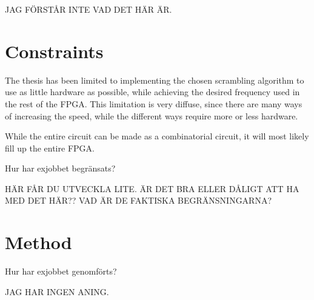 JAG FÖRSTÅR INTE VAD DET HÄR ÄR.

\section{Constraints}
The thesis has been limited to implementing the chosen scrambling 
algorithm to use as little hardware as possible, while achieving 
the desired frequency used in the rest of the FPGA. This limitation 
is very diffuse, since there are many ways of increasing the speed, 
while the different ways require more or less hardware.

While the entire circuit can be made as a combinatorial circuit, it 
will most likely fill up the entire FPGA.


Hur har exjobbet begränsats?

HÄR FÅR DU UTVECKLA LITE. ÄR DET BRA ELLER DÅLIGT ATT HA MED DET HÄR?? 
VAD ÄR DE FAKTISKA BEGRÄNSNINGARNA?

\section{Method}
Hur har exjobbet genomförts?

JAG HAR INGEN ANING.
